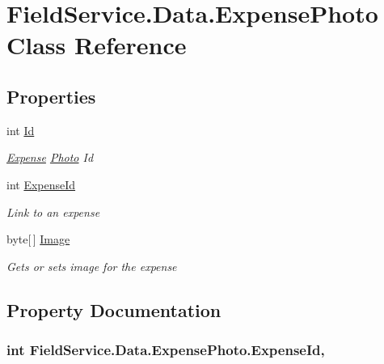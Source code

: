 \hypertarget{class_field_service_1_1_data_1_1_expense_photo}{\section{Field\+Service.\+Data.\+Expense\+Photo Class Reference}
\label{class_field_service_1_1_data_1_1_expense_photo}
}
\subsection*{Properties}
\begin{DoxyCompactItemize}
\item 
int \hyperlink{class_field_service_1_1_data_1_1_expense_photo_ab40fa86d3c3f8187a162da495e20fd86}{Id}
\begin{DoxyCompactList}\small\item\em \hyperlink{class_field_service_1_1_data_1_1_expense}{Expense} \hyperlink{class_field_service_1_1_data_1_1_photo}{Photo} Id \end{DoxyCompactList}\item 
int \hyperlink{class_field_service_1_1_data_1_1_expense_photo_a93a3afb33ba6831d8432cad3a2a359ce}{Expense\+Id}
\begin{DoxyCompactList}\small\item\em Link to an expense \end{DoxyCompactList}\item 
byte\mbox{[}$\,$\mbox{]} \hyperlink{class_field_service_1_1_data_1_1_expense_photo_aae448a3d6e804f6221c1b8281a37f731}{Image}
\begin{DoxyCompactList}\small\item\em Gets or sets image for the expense \end{DoxyCompactList}\end{DoxyCompactItemize}


\subsection{Property Documentation}
\hypertarget{class_field_service_1_1_data_1_1_expense_photo_a93a3afb33ba6831d8432cad3a2a359ce}{
\subsubsection[{Expense\+Id}]{\setlength{\rightskip}{0pt plus 5cm}int Field\+Service.\+Data.\+Expense\+Photo.\+Expense\+Id\hspace{0.3cm}{\ttfamily [get]}, {\ttfamily [set]}}}\label{class_field_service_1_1_data_1_1_expense_photo_a93a3afb33ba6831d8432cad3a2a359ce}


